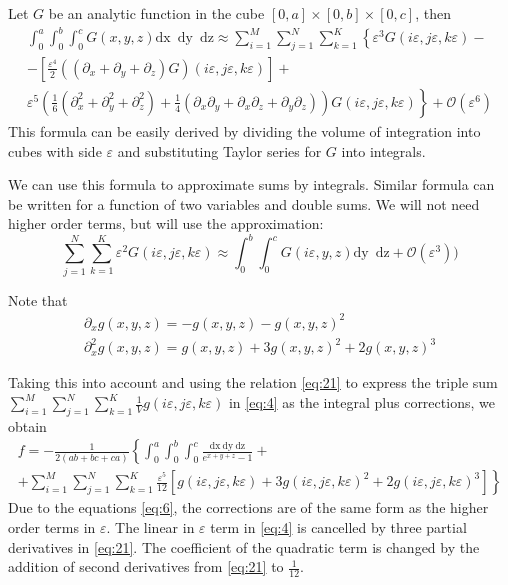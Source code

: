 \documentclass{article}
\newcommand{\dx}{\mathrm{dx}~}
\newcommand{\dy}{\mathrm{dy}~}
\newcommand{\dz}{\mathrm{dz}}
\begin{document}
Let $G$ be an analytic function in the cube $[0,a]\times[0,b]\times[0,c]$, then
\begin{multline}
  \label{eq:21}
  \int_{0}^{a} \int_{0}^{b}\int_{0}^{c}G(x,y,z) \dx\; \dy\;
  \dz\approx\sum_{i=1}^{M}\sum_{j=1}^{N}\sum_{k=1}^{K}\left\{\varepsilon^{3}G\left(i\varepsilon,j\varepsilon,k\varepsilon\right)-\right.\\
  \left.-\left[\frac{\varepsilon^{4}}{2}\left((\partial_{x}+\partial_{y}+\partial_{z})G\right)(i\varepsilon,j\varepsilon,k\varepsilon)\right]+\right.\\
  \left.\varepsilon^{5}\left(\frac{1}{6}(\partial_{x}^{2}+\partial_{y}^{2}+\partial_{z}^{2})+\frac{1}{4}(\partial_{x}\partial_{y}+\partial_{x}\partial_{z}+\partial_{y}\partial_{z})\right)G\left(i\varepsilon,j\varepsilon,k\varepsilon\right)
  \right\}+\mathcal{O}(\varepsilon^{6})
\end{multline}
This formula can be easily derived by dividing the volume of integration into cubes with side
$\varepsilon$ and substituting Taylor series for $G$ into integrals.

We can use this formula to approximate sums by integrals. Similar formula can be written for a
function of two variables and double sums. We will not need higher order terms, but will use the
approximation:
\begin{equation}
\label{eq:8}
  \sum_{j=1}^{N}\sum_{k=1}^{K}\varepsilon^{2}G\left(i\varepsilon,j\varepsilon,k\varepsilon\right)\approx \int_{0}^{b}\int_{0}^{c}G(i\varepsilon,y,z) \dy\; \dz+\mathcal{O}(\varepsilon^{3}))
\end{equation}



Note that
\begin{equation}
  \label{eq:6}
  \begin{array}{c}
    \partial_{x}g(x,y,z)=-g(x,y,z)-g(x,y,z)^{2}\\
    \partial_{x}^{2}g(x,y,z)=g(x,y,z)+3g(x,y,z)^{2}+2g(x,y,z)^{3}
  \end{array}
\end{equation}

Taking this into account and using the relation \eqref{eq:21} to express the triple sum
$ \sum_{i=1}^{M} \sum_{j=1}^{N} \sum_{k=1}^{K} \frac{1}{V}    g(i\varepsilon,j\varepsilon,k\varepsilon)$
in \eqref{eq:4} as the integral plus corrections, we obtain
\begin{multline}
\label{eq:23}
 f=-\frac{1}{2(ab+bc+ca)}\left\{\int_{0}^{a} \int_{0}^{b}\int_{0}^{c}\frac{\dx \dy \dz}{e^{x+y+z}-1}+\right.\\
  \left.+\sum_{i=1}^{M}\sum_{j=1}^{N}\sum_{k=1}^{K}\frac{\varepsilon^{5}}{12}\left[g(i\varepsilon,j\varepsilon,k\varepsilon)+3
      g(i\varepsilon,j\varepsilon,k\varepsilon)^{2}+2
      g(i\varepsilon,j\varepsilon,k\varepsilon)^{3}\right]\right\}
\end{multline}
Due to the equations \eqref{eq:6}, the corrections are of the same form as the higher order terms in
$\varepsilon$. The linear in $\varepsilon$ term in \eqref{eq:4} is cancelled by three partial
derivatives in \eqref{eq:21}. The coefficient of the quadratic term is changed by the addition of
second derivatives from \eqref{eq:21} to $\frac{1}{12}$.
\end{document}
